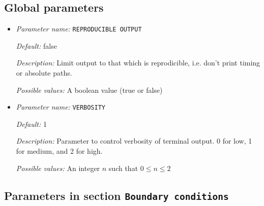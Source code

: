 \subsection{Global parameters}
\label{parameters:global}


\begin{itemize}
\item {\it Parameter name:} {\tt REPRODUCIBLE OUTPUT}
\label{parameters:REPRODUCIBLE OUTPUT}
\label{parameters:REPRODUCIBLE_20OUTPUT}


{\it Default:} false


{\it Description:} Limit output to that which is reprodicible, i.e. don't print timing or absolute paths.


{\it Possible values:} A boolean value (true or false)
\item {\it Parameter name:} {\tt VERBOSITY}
\label{parameters:VERBOSITY}


{\it Default:} 1


{\it Description:} Parameter to control verbosity of terminal output. 0 for low, 1 for medium, and 2 for high.


{\it Possible values:} An integer $n$ such that $0\leq n \leq 2$
\end{itemize}



\subsection{Parameters in section \tt Boundary conditions}
\label{parameters:Boundary_20conditions}


